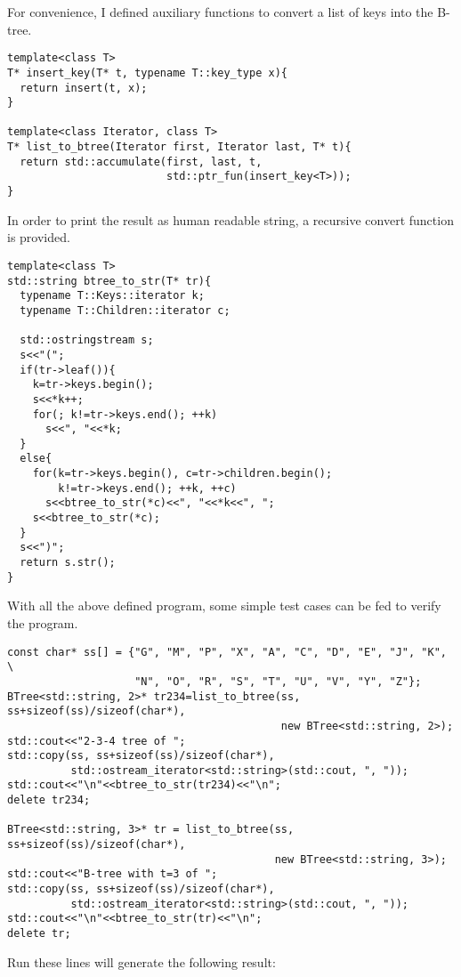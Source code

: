 \documentclass{article}
\begin{document}
For convenience, I defined auxiliary functions to convert a
list of keys into the B-tree.

\begin{lstlisting}
template<class T>
T* insert_key(T* t, typename T::key_type x){
  return insert(t, x);
}

template<class Iterator, class T>
T* list_to_btree(Iterator first, Iterator last, T* t){
  return std::accumulate(first, last, t,
                         std::ptr_fun(insert_key<T>));
}
\end{lstlisting}

In order to print the result as human readable string, a recursive
convert function is provided.

\begin{lstlisting}
template<class T>
std::string btree_to_str(T* tr){
  typename T::Keys::iterator k;
  typename T::Children::iterator c;

  std::ostringstream s;
  s<<"(";
  if(tr->leaf()){
    k=tr->keys.begin();
    s<<*k++;
    for(; k!=tr->keys.end(); ++k)
      s<<", "<<*k;
  }
  else{
    for(k=tr->keys.begin(), c=tr->children.begin();
        k!=tr->keys.end(); ++k, ++c)
      s<<btree_to_str(*c)<<", "<<*k<<", ";
    s<<btree_to_str(*c);
  }
  s<<")";
  return s.str();
}
\end{lstlisting}

With all the above defined program, some simple test cases can be
fed to verify the program.

\begin{lstlisting}
const char* ss[] = {"G", "M", "P", "X", "A", "C", "D", "E", "J", "K", \
                    "N", "O", "R", "S", "T", "U", "V", "Y", "Z"};
BTree<std::string, 2>* tr234=list_to_btree(ss, ss+sizeof(ss)/sizeof(char*),
                                           new BTree<std::string, 2>);
std::cout<<"2-3-4 tree of ";
std::copy(ss, ss+sizeof(ss)/sizeof(char*), 
          std::ostream_iterator<std::string>(std::cout, ", "));
std::cout<<"\n"<<btree_to_str(tr234)<<"\n";
delete tr234;

BTree<std::string, 3>* tr = list_to_btree(ss, ss+sizeof(ss)/sizeof(char*),
                                          new BTree<std::string, 3>);
std::cout<<"B-tree with t=3 of ";
std::copy(ss, ss+sizeof(ss)/sizeof(char*), 
          std::ostream_iterator<std::string>(std::cout, ", "));
std::cout<<"\n"<<btree_to_str(tr)<<"\n";
delete tr;
\end{lstlisting}

Run these lines will generate the following result:
\end{document}
